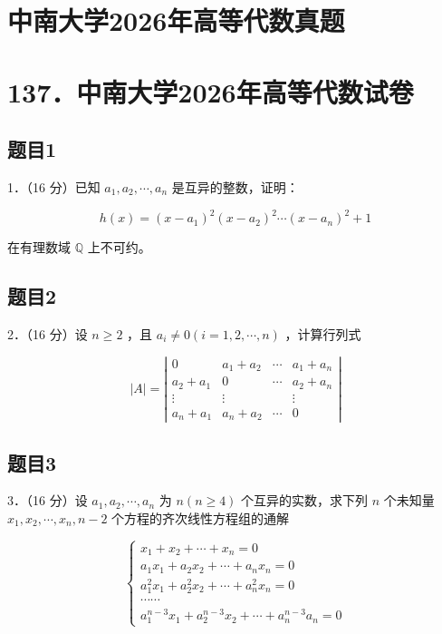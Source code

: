 \documentclass{article}
\begin{document}
\section*{中南大学2026年高等代数真题}
\section*{137．中南大学2026年高等代数试卷}

\subsection{题目1}
1．（16 分）已知 \(a_{1}, a_{2}, \cdots, a_{n}\) 是互异的整数，证明：

\[
h(x)=\left(x-a_{1}\right)^{2}\left(x-a_{2}\right)^{2} \cdots\left(x-a_{n}\right)^{2}+1
\]

在有理数域 \(\mathbb{Q}\) 上不可约。

\subsection{题目2}
2．（16 分）设 \(n \geq 2\) ，且 \(a_{i} \neq 0(i=1,2, \cdots, n)\) ，计算行列式

\[
|A|=\left|\begin{array}{cccc}
0 & a_{1}+a_{2} & \cdots & a_{1}+a_{n} \\
a_{2}+a_{1} & 0 & \cdots & a_{2}+a_{n} \\
\vdots & \vdots & & \vdots \\
a_{n}+a_{1} & a_{n}+a_{2} & \cdots & 0
\end{array}\right|
\]

\subsection{题目3}
3．（16 分）设 \(a_{1}, a_{2}, \cdots, a_{n}\) 为 \(n(n \geq 4)\) 个互异的实数，求下列 \(n\) 个未知量 \(x_{1}, x_{2}, \cdots, x_{n}, n-2\) 个方程的齐次线性方程组的通解

\[
\left\{\begin{array}{c}
x_{1}+x_{2}+\cdots+x_{n}=0 \\
a_{1} x_{1}+a_{2} x_{2}+\cdots+a_{n} x_{n}=0 \\
a_{1}^{2} x_{1}+a_{2}^{2} x_{2}+\cdots+a_{n}^{2} x_{n}=0 \\
\cdots \cdots \\
a_{1}^{n-3} x_{1}+a_{2}^{n-3} x_{2}+\cdots+a_{n}^{n-3} a_{n}=0
\end{array}\right.
\]
\end{document}
